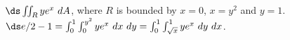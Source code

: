 {$\ds \iint_R ye^x\ dA$, where $R$ is bounded by $x=0$, $x=y^2$ and $y=1$. 
}
{$\ds e/2-1 = \int_{0}^1\int_{0}^{y^2}ye^x\ dx\ dy = \int_{0}^1\int_{\sqrt{x}}^{1}ye^x\ dy\ dx$.
}